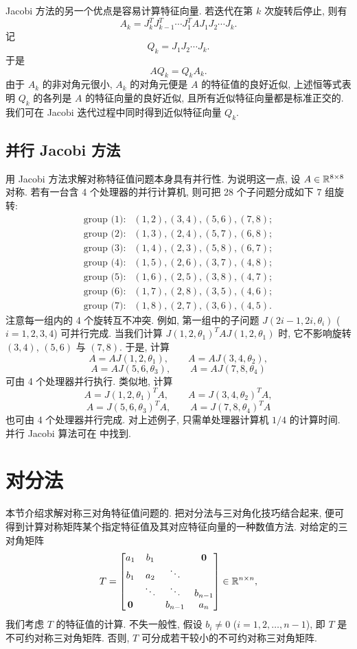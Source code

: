 Jacobi 方法的另一个优点是容易计算特征向量. 若迭代在第 $k$ 次旋转后停止, 则有
\[
  A_k=J_k^TJ_{k-1}^T\cdots J_1^TAJ_1J_2\cdots J_k.
\]
记
\[
  Q_k=J_1J_2\cdots J_k.
\]
于是
\[
  AQ_k=Q_kA_k.
\]
由于 $A_k$ 的非对角元很小, $A_k$ 的对角元便是 $A$ 的特征值的良好近似, 上述恒等式表明 $Q_k$ 的各列是 $A$ 的特征向量的良好近似, 且所有近似特征向量都是标准正交的. 我们可在 Jacobi 迭代过程中同时得到近似特征向量 $Q_k$.

\subsection{并行 Jacobi 方法}
\label{sec:8-3-3}

用 Jacobi 方法求解对称特征值问题本身具有并行性. 为说明这一点, 设 $A\in\mathbb{R}^{8\times8}$ 对称. 若有一台含 4 个处理器的并行计算机, 则可把 28 个子问题分成如下 7 组旋转:
\[
  \begin{array}{ll}
    \text{group (1)}: & (1,2),(3,4),(5,6),(7,8);\\
    \text{group (2)}: & (1,3),(2,4),(5,7),(6,8);\\
    \text{group (3)}: & (1,4),(2,3),(5,8),(6,7);\\
    \text{group (4)}: & (1,5),(2,6),(3,7),(4,8);\\
    \text{group (5)}: & (1,6),(2,5),(3,8),(4,7);\\
    \text{group (6)}: & (1,7),(2,8),(3,5),(4,6);\\
    \text{group (7)}: & (1,8),(2,7),(3,6),(4,5).
  \end{array}
\]
注意每一组内的 4 个旋转互不冲突. 例如, 第一组中的子问题 $J(2i-1,2i,\theta_i)$ ($i=1,2,3,4$) 可并行完成. 当我们计算 $J(1,2,\theta_1)^TAJ(1,2,\theta_1)$ 时, 它不影响旋转 $(3,4)$, $(5,6)$ 与 $(7,8)$. 于是, 计算
\[
  A=AJ(1,2,\theta_1),\qquad A=AJ(3,4,\theta_2),
\]
\[
  A=AJ(5,6,\theta_3),\qquad A=AJ(7,8,\theta_4)
\]
可由 4 个处理器并行执行. 类似地, 计算
\[
  A=J(1,2,\theta_1)^TA,\qquad A=J(3,4,\theta_2)^TA,
\]
\[
  A=J(5,6,\theta_3)^TA,\qquad A=J(7,8,\theta_4)^TA
\]
也可由 4 个处理器并行完成. 对上述例子, 只需单处理器计算机 $1/4$ 的计算时间. 并行 Jacobi 算法可在 \cite{src:32} 中找到.

\section{对分法}
\label{sec:8-4}

本节介绍求解对称三对角特征值问题的. 把对分法与三对角化技巧结合起来, 便可得到计算对称矩阵某个指定特征值及其对应特征向量的一种数值方法. 对给定的三对角矩阵
\begin{equation}
  T=\begin{bmatrix}
    a_1 & b_1 & & \mathbf{0}\\
    b_1 & a_2 & \ddots & \\
     & \ddots & \ddots & b_{n-1}\\
    \mathbf{0} & & b_{n-1} & a_n
  \end{bmatrix}\in\mathbb{R}^{n\times n},
  \label{eq:8-5}
\end{equation}
我们考虑 $T$ 的特征值的计算. 不失一般性, 假设 $b_i\neq0$ ($i=1,2,\ldots,n-1$), 即 $T$ 是不可约对称三对角矩阵. 否则, $T$ 可分成若干较小的不可约对称三对角矩阵.

